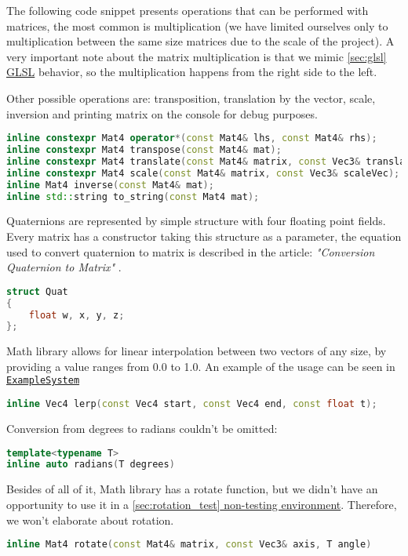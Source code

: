 The following code snippet presents operations that can be performed with matrices, the most common is multiplication (we have limited ourselves only to multiplication between the same size matrices due to the scale of the project). A very important note about the matrix multiplication is that we mimic \hyperref[sec:glsl]{\ref*{sec:glsl} GLSL} behavior, so the multiplication happens from the right side to the left.

Other possible operations are: transposition, translation by the vector, scale, inversion and printing matrix on the console for debug purposes.
\begin{lstlisting}[language=c++, caption=Matrix operations (./engine/include/tsengine/math.hpp)]
inline constexpr Mat4 operator*(const Mat4& lhs, const Mat4& rhs);
inline constexpr Mat4 transpose(const Mat4& mat);
inline constexpr Mat4 translate(const Mat4& matrix, const Vec3& translation);
inline constexpr Mat4 scale(const Mat4& matrix, const Vec3& scaleVec);
inline Mat4 inverse(const Mat4& mat);
inline std::string to_string(const Mat4 mat);
\end{lstlisting}

Quaternions are represented by simple structure with four floating point fields. Every matrix has a constructor taking this structure as a parameter, the equation used to convert quaternion to matrix is described in the article: \textit{"Conversion Quaternion to Matrix"} \cite{quatToMat}.
\begin{lstlisting}[language=c++, caption=Quaternion class (./engine/include/tsengine/math.hpp)]
struct Quat
{
    float w, x, y, z;
};
\end{lstlisting}

Math library allows for linear interpolation between two vectors of any size, by providing a value ranges from 0.0 to 1.0.
An example of the usage can be seen in \hyperref[sec:example_system]{\texttt{ExampleSystem}}
\begin{lstlisting}[language=c++, caption=Linear interpolation of Vector (./engine/include/tsengine/math.hpp)]
inline Vec4 lerp(const Vec4 start, const Vec4 end, const float t);
\end{lstlisting}

Conversion from degrees to radians couldn't be omitted:
\begin{lstlisting}[language=c++, caption=Radians conversion (./engine/include/tsengine/math.hpp)]
template<typename T>
inline auto radians(T degrees)
\end{lstlisting}

Besides of all of it, Math library has a rotate function, but we didn't have an opportunity to use it in a \hyperref[sec:rotation_test]{\ref*{sec:rotation_test} non-testing environment}. Therefore, we won't elaborate about rotation.
\begin{lstlisting}[language=c++, caption=Rotation function (./engine/include/tsengine/math.hpp)]
inline Mat4 rotate(const Mat4& matrix, const Vec3& axis, T angle)
\end{lstlisting}

